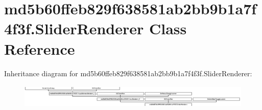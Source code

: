 \hypertarget{classmd5b60ffeb829f638581ab2bb9b1a7f4f3f_1_1SliderRenderer}{}\section{md5b60ffeb829f638581ab2bb9b1a7f4f3f.\+Slider\+Renderer Class Reference}
\label{classmd5b60ffeb829f638581ab2bb9b1a7f4f3f_1_1SliderRenderer}
Inheritance diagram for md5b60ffeb829f638581ab2bb9b1a7f4f3f.\+Slider\+Renderer\+:\begin{figure}[H]
\begin{center}
\leavevmode
\includegraphics[height=1.122807cm]{classmd5b60ffeb829f638581ab2bb9b1a7f4f3f_1_1SliderRenderer}
\end{center}
\end{figure}
